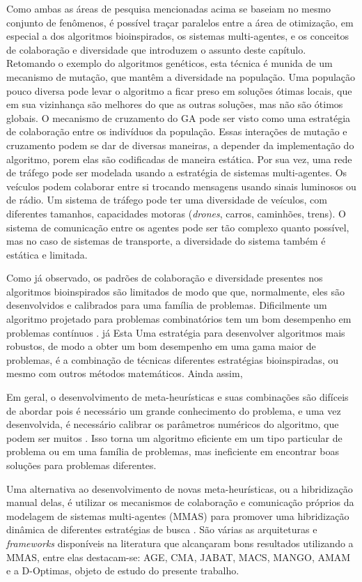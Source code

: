 Como ambas as áreas de pesquisa mencionadas acima se baseiam no mesmo conjunto de fenômenos, é possível traçar paralelos entre a área de otimização, em especial a dos algoritmos bioinspirados, os sistemas multi-agentes, e os conceitos de colaboração e diversidade que introduzem o assunto deste capítulo. Retomando o exemplo do algoritmos genéticos, esta técnica é munida de um mecanismo de mutação, que mantêm a diversidade na população. Uma população pouco diversa pode levar o algoritmo a ficar preso em soluções ótimas locais, que em sua vizinhança são melhores do que as outras soluções, mas não são ótimos globais. O mecanismo de cruzamento do GA pode ser visto como uma estratégia de colaboração entre os indivíduos da população. Essas interações de mutação e cruzamento podem se dar de diversas maneiras, a depender da implementação do algoritmo, porem elas são codificadas de maneira estática. Por sua vez, uma rede de tráfego pode ser modelada usando a estratégia de sistemas multi-agentes. Os veículos podem colaborar entre si trocando mensagens usando sinais luminosos ou de rádio. Um sistema de tráfego pode ter uma diversidade de veículos, com diferentes tamanhos, capacidades motoras (\textit{drones}, carros, caminhões, trens). O sistema de comunicação entre os agentes pode ser tão complexo quanto possível, mas no caso de sistemas de transporte, a diversidade do sistema também é estática e limitada.

Como já observado, os padrões de colaboração e diversidade presentes nos algoritmos bioinspirados são limitados de modo que que, normalmente, eles são desenvolvidos e calibrados para uma família de problemas. Dificilmente um algoritmo projetado para problemas combinatórios tem um bom desempenho em problemas contínuos \cite{burke2003}.  já  Esta Uma estratégia para desenvolver algoritmos mais robustos, de modo a obter um bom desempenho em uma gama maior de problemas, é a combinação de técnicas diferentes estratégias bioinspiradas, ou mesmo com outros métodos matemáticos. Ainda assim, 

Em geral, o desenvolvimento de meta-heurísticas e suas combinações são difíceis de abordar pois é necessário um grande conhecimento do problema, e uma vez desenvolvida, é necessário calibrar os parâmetros numéricos do algoritmo, que podem ser muitos \cite{stutzle2018}. Isso torna um algoritmo eficiente em um tipo particular de problema ou em uma família de problemas, mas ineficiente em encontrar boas soluções para problemas diferentes.

Uma alternativa ao desenvolvimento de novas meta-heurísticas, ou a hibridização manual delas, é utilizar os mecanismos de colaboração e comunicação próprios da modelagem de sistemas multi-agentes (MMAS) para promover uma hibridização dinâmica de diferentes estratégias de busca \cite{gong2015, zheng2015, fernandes2009, milano2004}. São várias as arquiteturas e \textit{frameworks} disponíveis na literatura que alcançaram bons resultados utilizando a MMAS, entre elas destacam-se: AGE, CMA, JABAT, MACS, MANGO, AMAM \cite{silva2018} e a D-Optimas, objeto de estudo do presente trabalho.

